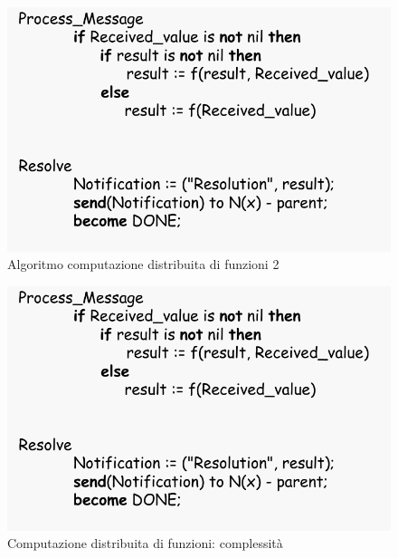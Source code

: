 \documentclass[12pt]{article}
\begin{document}
			\begin{figure}[h!]
				\centering
				\includegraphics[scale=0.3]{img/distfun1.png}
				\caption{Algoritmo computazione distribuita di funzioni 2}
			\end{figure}
			\begin{figure}[h!]
				\centering
				\includegraphics[scale=0.3]{img/distfun1.png}
				\caption{Computazione distribuita di funzioni: complessità}
			\end{figure}
			
		
		
				
			
				   
			
		
			
			
			
			
		
		
			 
			
					 
			 
	
		
		
\end{document}
